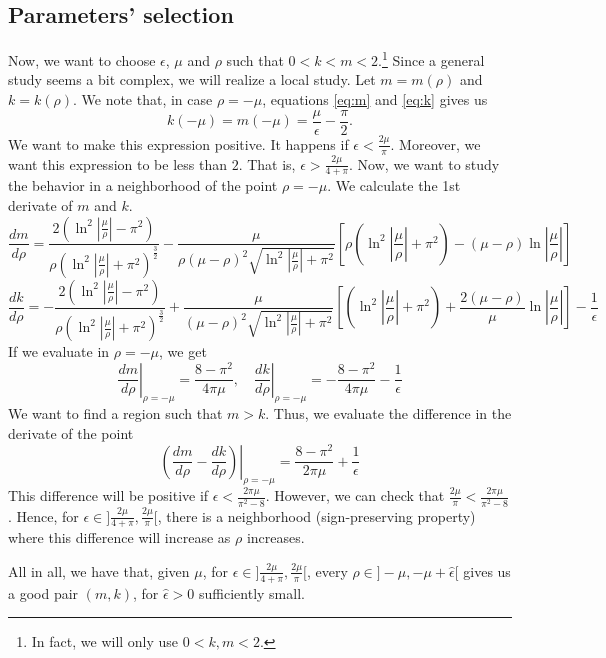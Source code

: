 \documentclass[a4paper,preprint,11pt]{article}
\begin{document}
\subsection{Parameters' selection}
Now, we want to choose $\epsilon$, $\mu$ and $\rho$ such that $0<k<m<2$.\footnote{In fact, we will only use $0<k,m<2$.} Since a general study seems a bit complex, we will realize a local study. Let $m=m(\rho)$ and $k=k(\rho)$. We note that, in case $\rho=-\mu$, equations \ref{eq:m} and \ref{eq:k} gives us
$$
k(-\mu) = m(-\mu) = \frac{\mu}{\epsilon}-\frac{\pi}{2}.
$$
We want to make this expression positive. It happens if $\epsilon<\frac{2\mu}{\pi}$. Moreover, we want this expression to be less than $2$. That is, $\epsilon>\frac{2\mu}{4+\pi}$. Now, we want to study the behavior in a neighborhood of the point $\rho=-\mu$. We calculate the 1st derivate of $m$ and $k$.
$$
\frac{dm}{d\rho} = \frac{2(\ln^2\left\lvert\frac{\mu}{\rho}\right\rvert-\pi^2)}{\rho(\ln^2\left\lvert\frac{\mu}{\rho}\right\rvert+\pi^2)^{\frac{3}{2}}} -
\frac{\mu}{\rho(\mu-\rho)^2\sqrt{\ln^2\left\lvert\frac{\mu}{\rho}\right\rvert+\pi^2}}
\left[
\rho(\ln^2\left\lvert\frac{\mu}{\rho}\right\rvert+\pi^2)-(\mu-\rho)\ln\left\lvert\frac{\mu}{\rho}\right\rvert
\right]
$$
$$
\frac{dk}{d\rho} = -\frac{2(\ln^2\left\lvert\frac{\mu}{\rho}\right\rvert-\pi^2)}{\rho(\ln^2\left\lvert\frac{\mu}{\rho}\right\rvert+\pi^2)^{\frac{3}{2}}} +
\frac{\mu}{(\mu-\rho)^2\sqrt{\ln^2\left\lvert\frac{\mu}{\rho}\right\rvert+\pi^2}}
\left[
(\ln^2\left\lvert\frac{\mu}{\rho}\right\rvert+\pi^2)+\frac{2(\mu-\rho)}{\mu}\ln\left\lvert\frac{\mu}{\rho}\right\rvert
\right] 
- \frac{1}{\epsilon}
$$
If we evaluate in $\rho=-\mu$, we get
$$
\left.
\frac{dm}{d\rho}
\right\rvert_{\rho=-\mu} =
\frac{8-\pi^2}{4\pi\mu}, \quad
\left.
\frac{dk}{d\rho}
\right\rvert_{\rho=-\mu} =
-\frac{8-\pi^2}{4\pi\mu} - \frac{1}{\epsilon}
$$
We want to find a region such that $m>k$. Thus, we evaluate the difference in the derivate of the point
$$
\left.\left(\frac{dm}{d\rho}-\frac{dk}{d\rho}\right)\right\rvert_{\rho=-\mu} 
=
\frac{8-\pi^2}{2\pi\mu} + \frac{1}{\epsilon}
$$
This difference will be positive if $\epsilon<\frac{2\pi\mu}{\pi^2-8}$. However, we can check that $\frac{2\mu}{\pi}<\frac{2\pi\mu}{\pi^2-8}$. Hence, for $\epsilon\in]\frac{2\mu}{4+\pi},\frac{2\mu}{\pi}[$, there is a neighborhood (sign-preserving property) where this difference will increase as $\rho$ increases.

All in all, we have that, given $\mu$, for $\epsilon\in]\frac{2\mu}{4+\pi},\frac{2\mu}{\pi}[$, every $\rho\in]-\mu,-\mu+\hat{\epsilon}[$ gives us a good pair $(m,k)$, for $\hat{\epsilon}>0$ sufficiently small.
\end{document}
